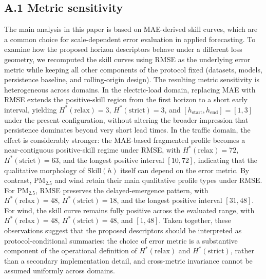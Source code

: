 \documentclass[pdflatex,sn-mathphys]{sn-jnl}
\begin{document}
\appendix
\subsection*{A.1 Metric sensitivity}
The main analysis in this paper is based on MAE-derived skill curves, which are a common choice for scale-dependent error evaluation in applied forecasting. To examine how the proposed horizon descriptors behave under a different loss geometry, we recomputed the skill curves using RMSE as the underlying error metric while keeping all other components of the protocol fixed (datasets, models, persistence baseline, and rolling-origin design).
The resulting metric sensitivity is heterogeneous across domains. In the electric-load domain, replacing MAE with RMSE extends the positive-skill region from the first horizon to a short early interval, yielding $H^*(\mathrm{relax})=3$, $H^*(\mathrm{strict})=3$, and $[h_{\mathrm{start}},h_{\mathrm{end}}]=[1,3]$ under the present configuration, without altering the broader impression that persistence dominates beyond very short lead times. In the traffic domain, the effect is considerably stronger: the MAE-based fragmented profile becomes a near-contiguous positive-skill regime under RMSE, with $H^*(\mathrm{relax})=72$, $H^*(\mathrm{strict})=63$, and the longest positive interval $[10,72]$, indicating that the qualitative morphology of $\mathrm{Skill}(h)$ itself can depend on the error metric.
By contrast, PM$_{2.5}$ and wind retain their main qualitative profile types under RMSE. For PM$_{2.5}$, RMSE preserves the delayed-emergence pattern, with $H^*(\mathrm{relax})=48$, $H^*(\mathrm{strict})=18$, and the longest positive interval $[31,48]$. For wind, the skill curve remains fully positive across the evaluated range, with $H^*(\mathrm{relax})=48$, $H^*(\mathrm{strict})=48$, and $[1,48]$. Taken together, these observations suggest that the proposed descriptors should be interpreted as protocol-conditional summaries: the choice of error metric is a substantive component of the operational definition of $H^*(\mathrm{relax})$ and $H^*(\mathrm{strict})$, rather than a secondary implementation detail, and cross-metric invariance cannot be assumed uniformly across domains.

\end{document}
